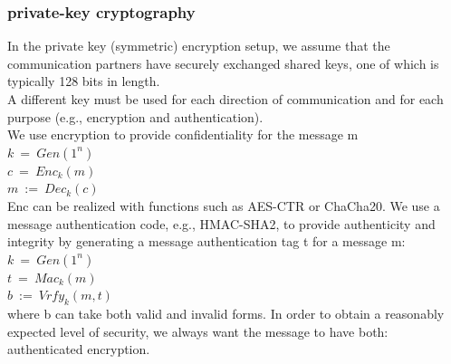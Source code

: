 \subsubsection{private-key cryptography}\cite{b38}
In the private key (symmetric) encryption setup, we assume that the communication partners 
have securely exchanged shared keys, one of which is typically 128 bits in length.
\\
A different key must be used for each direction of communication and for each purpose 
(e.g., encryption and authentication).
\\
We use encryption to provide confidentiality for the message m
\\
$k \ = \ Gen(1^n)$
\\
$c \ = \ Enc_k(m)$
\\
$m \ := \ Dec_k(c)$
\\
Enc can be realized with functions such as AES-CTR or ChaCha20.
We use a message authentication code, e.g., HMAC-SHA2, to provide authenticity and 
integrity by generating a message authentication tag t for a message m:
\\
$k \ = \ Gen(1^n)$
\\
$t \ = \ Mac_k(m)$
\\
$b \ := \ Vrfy_k(m, t)$
\\
where b can take both valid and invalid forms.
In order to obtain a reasonably expected level of security, we always want the message 
to have both: authenticated encryption.

